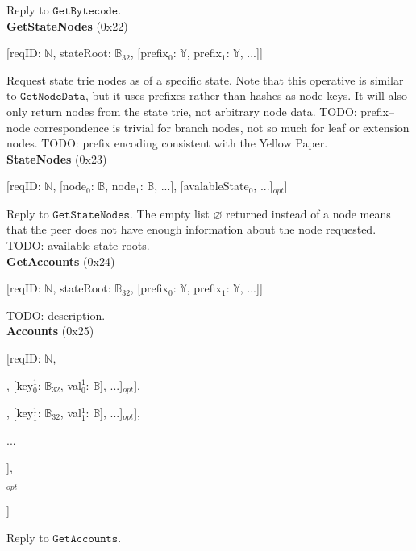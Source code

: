 \documentclass{amsart}
\begin{document}
Reply to $\texttt{GetBytecode}$.\\

\textbf{GetStateNodes} (0x22)

[reqID: $\mathbb{N}$, stateRoot: $\mathbb{B}_{32}$,
[prefix$_0$: $\mathbb{Y}$, prefix$_1$: $\mathbb{Y}$, ...]]
\medskip

Request state trie nodes as of a specific state.
Note that this operative is similar to $\texttt{GetNodeData}$,
but it uses prefixes rather than hashes as node keys.
It will also only return nodes from the state trie,
not arbitrary node data.
TODO: prefix--node correspondence is trivial for branch nodes, not so much for leaf or extension nodes.
TODO: prefix encoding consistent with the Yellow Paper.\\

\textbf{StateNodes} (0x23)

[reqID: $\mathbb{N}$,
[node$_0$: $\mathbb{B}$, node$_1$: $\mathbb{B}$, ...],
[avalableState$_0$, ...]$_{opt}$]
\medskip

Reply to $\texttt{GetStateNodes}$.
The empty list $\varnothing$ returned instead of a node means that the peer does not have enough information about the node requested.
TODO: available state roots.\\

\textbf{GetAccounts} (0x24)

[reqID: $\mathbb{N}$, stateRoot: $\mathbb{B}_{32}$, [prefix$_0$: $\mathbb{Y}$, prefix$_1$: $\mathbb{Y}$, ...]]
\medskip

TODO: description.\\

\textbf{Accounts} (0x25)

[reqID: $\mathbb{N}$,

\quad [

\qquad [status$_0$, [[key$^0_{0}$: $\mathbb{B}_{32}$, val$^0_{0}$: $\mathbb{B}$], [key$^1_{0}$: $\mathbb{B}_{32}$, val$^1_{0}$: $\mathbb{B}$], ...]$_{opt}$],

\qquad [status$_1$, [[key$^0_{1}$: $\mathbb{B}_{32}$, val$^0_{1}$: $\mathbb{B}$], [key$^1_{1}$: $\mathbb{B}_{32}$, val$^1_{1}$: $\mathbb{B}$], ...]$_{opt}$],

\qquad ...

\quad ],

\quad [avalableState$_0$, ...]$_{opt}$

]
\medskip

Reply to $\texttt{GetAccounts}$.\\
\end{document}
